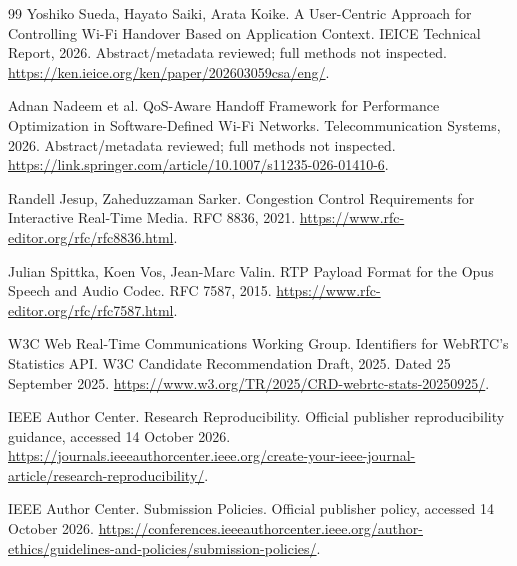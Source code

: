 \documentclass[11pt,a4paper]{article}
\begin{document}
\begin{thebibliography}{99}
 Yoshiko Sueda, Hayato Saiki, Arata Koike. A User-Centric Approach for Controlling Wi-Fi Handover Based on Application Context. IEICE Technical Report, 2026. Abstract/metadata reviewed; full methods not inspected.
\url{https://ken.ieice.org/ken/paper/202603059csa/eng/}.

 Adnan Nadeem et al. QoS-Aware Handoff Framework for Performance Optimization in Software-Defined Wi-Fi Networks. Telecommunication Systems, 2026. Abstract/metadata reviewed; full methods not inspected.
\url{https://link.springer.com/article/10.1007/s11235-026-01410-6}.

 Randell Jesup, Zaheduzzaman Sarker. Congestion Control Requirements for Interactive Real-Time Media. RFC 8836, 2021.
\url{https://www.rfc-editor.org/rfc/rfc8836.html}.

 Julian Spittka, Koen Vos, Jean-Marc Valin. RTP Payload Format for the Opus Speech and Audio Codec. RFC 7587, 2015.
\url{https://www.rfc-editor.org/rfc/rfc7587.html}.

 W3C Web Real-Time Communications Working Group. Identifiers for WebRTC's Statistics API. W3C Candidate Recommendation Draft, 2025. Dated 25 September 2025.
\url{https://www.w3.org/TR/2025/CRD-webrtc-stats-20250925/}.

 IEEE Author Center. Research Reproducibility. Official publisher reproducibility guidance, accessed 14 October 2026.
\url{https://journals.ieeeauthorcenter.ieee.org/create-your-ieee-journal-article/research-reproducibility/}.

 IEEE Author Center. Submission Policies. Official publisher policy, accessed 14 October 2026.
\url{https://conferences.ieeeauthorcenter.ieee.org/author-ethics/guidelines-and-policies/submission-policies/}.
\end{thebibliography}
\end{document}
